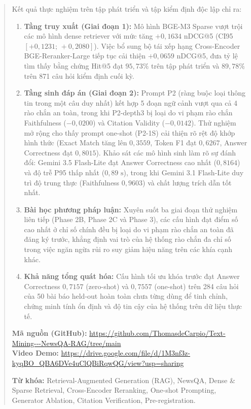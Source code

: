 \begin{abstract}
Kết quả thực nghiệm trên tập phát triển và tập kiểm định độc lập chỉ ra:
\begin{enumerate}[noitemsep, topsep=1pt, parsep=0pt]
  \item \textbf{Tầng truy xuất (Giai đoạn 1):} Mô hình BGE-M3 Sparse vượt trội các mô hình dense retriever với mức tăng $+0{,}1634$ nDCG@5 (CI95 $[+0{,}1231;\,+0{,}2080]$). Việc bổ sung bộ tái xếp hạng Cross-Encoder BGE-Reranker-Large tiếp tục cải thiện $+0{,}0659$ nDCG@5, đưa tỷ lệ tìm thấy bằng chứng Hit@5 đạt $95{,}73\%$ trên tập phát triển và $89{,}78\%$ trên 871 câu hỏi kiểm định cuối kỳ.
  \item \textbf{Tầng sinh đáp án (Giai đoạn 2):} Prompt P2 (ràng buộc loại thông tin trong một câu duy nhất) kết hợp 5 đoạn ngữ cảnh vượt qua cả 4 rào chắn an toàn, trong khi P2-depth3 bị loại do vi phạm rào chắn Faithfulness ($-0{,}0200$) và Citation Validity ($-0{,}0142$). Thử nghiệm mở rộng cho thấy prompt one-shot (P2-1S) cải thiện rõ rệt độ khớp hình thức (Exact Match tăng lên $0{,}3559$, Token F1 đạt $0{,}6267$, Answer Correctness đạt $0{,}8015$). Khảo sát các mô hình sinh làm rõ sự đánh đổi: Gemini 3.5 Flash-Lite đạt Answer Correctness cao nhất ($0{,}8164$) và độ trễ P95 thấp nhất ($0{,}89\text{ s}$), trong khi Gemini 3.1 Flash-Lite duy trì độ trung thực (Faithfulness $0{,}9603$) và chất lượng trích dẫn tốt nhất.
  \item \textbf{Bài học phương pháp luận:} Xuyên suốt ba giai đoạn thử nghiệm liên tiếp (Phase 2B, Phase 2C và Phase 3), các cấu hình đạt điểm số cao nhất ở chỉ số chính đều bị loại do vi phạm rào chắn an toàn đã đăng ký trước, khẳng định vai trò của hệ thống rào chắn đa chỉ số trong việc ngăn ngừa rủi ro suy giảm hiệu năng trên các khía cạnh khác.
  \item \textbf{Khả năng tổng quát hóa:} Cấu hình tối ưu khóa trước đạt Answer Correctness $0{,}7157$ (zero-shot) và $0{,}7557$ (one-shot) trên 284 câu hỏi của 50 bài báo held-out hoàn toàn chưa từng dùng để tinh chỉnh, chứng minh tính ổn định và độ tin cậy của hệ thống trên dữ liệu thực tế.
\end{enumerate}

\noindent\textbf{Mã nguồn (GitHub):} \url{https://github.com/ThomasdeCarpio/Text-Mining---NewsQA-RAG/tree/main} \\
\textbf{Video Demo:} \url{https://drive.google.com/file/d/1M3nf3z-kyqBO_QBA6DVe4uClQBiRqwQG/view?usp=sharing}

\noindent\textbf{Từ khóa:} Retrieval-Augmented Generation (RAG), NewsQA, Dense \& Sparse Retrieval, Cross-Encoder Reranking, One-shot Prompting, Generator Ablation, Citation Verification, Pre-registration.
\end{abstract}
